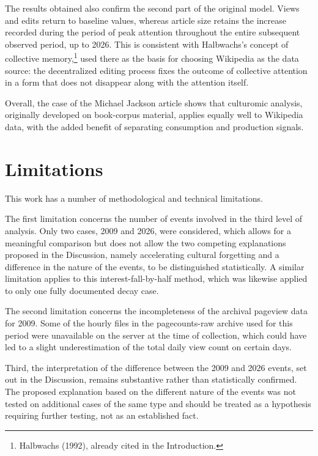 \documentclass[11pt]{article}
\begin{document}
The results obtained also confirm the second part of the original model. Views and edits return to baseline values, whereas article size retains the increase recorded during the period of peak attention throughout the entire subsequent observed period, up to 2026. This is consistent with Halbwachs's concept of collective memory,\footnote{Halbwachs (1992), already cited in the Introduction.} used there as the basis for choosing Wikipedia as the data source: the decentralized editing process fixes the outcome of collective attention in a form that does not disappear along with the attention itself.

Overall, the case of the Michael Jackson article shows that culturomic analysis, originally developed on book-corpus material, applies equally well to Wikipedia data, with the added benefit of separating consumption and production signals.


\section*{Limitations}

This work has a number of methodological and technical limitations.

The first limitation concerns the number of events involved in the third level of analysis. Only two cases, 2009 and 2026, were considered, which allows for a meaningful comparison but does not allow the two competing explanations proposed in the Discussion, namely accelerating cultural forgetting and a difference in the nature of the events, to be distinguished statistically. A similar limitation applies to this interest-fall-by-half method, which was likewise applied to only one fully documented decay case.

The second limitation concerns the incompleteness of the archival pageview data for 2009. Some of the hourly files in the pagecounts-raw archive used for this period were unavailable on the server at the time of collection, which could have led to a slight underestimation of the total daily view count on certain days.

Third, the interpretation of the difference between the 2009 and 2026 events, set out in the Discussion, remains substantive rather than statistically confirmed. The proposed explanation based on the different nature of the events was not tested on additional cases of the same type and should be treated as a hypothesis requiring further testing, not as an established fact.
\end{document}
